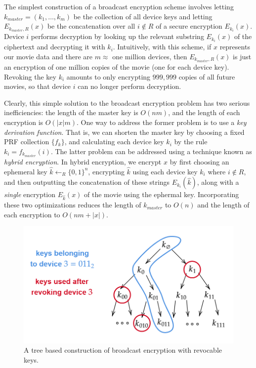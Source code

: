 The simplest construction of a broadcast encryption scheme involves
letting \(k_{master} = (k_1, \ldots, k_m)\) be the collection of all
device keys and letting \(E_{k_{master}, R}(x)\) be the concatenation
over all \(i \notin R\) of a secure encryption \(E_{k_i}(x)\). Device
\(i\) performs decryption by looking up the relevant substring
\(E_{k_i}(x)\) of the ciphertext and decrypting it with \(k_i\).
Intuitively, with this scheme, if \(x\) represents our movie data and
there are \(m \approx\) one million devices, then
\(E_{k_{master}, R}(x)\) is just an encryption of one million copies of
the movie (one for each device key). Revoking the key \(k_i\) amounts to
only encrypting \(999,999\) copies of all future movies, so that device
\(i\) can no longer perform decryption.

Clearly, this simple solution to the broadcast encryption problem has
two serious inefficiencies: the length of the master key is \(O(nm)\),
and the length of each encryption is \(O(|x|m)\). One way to address the
former problem is to use a \emph{key derivation function}. That is, we
can shorten the master key by choosing a fixed PRF collection
\(\{f_k\}\), and calculating each device key \(k_i\) by the rule
\(k_i = f_{k_{master}}(i)\). The latter problem can be addressed using a
technique known as \emph{hybrid encryption}. In hybrid encryption, we
encrypt \(x\) by first choosing an ephemeral key
\(\hat k \leftarrow_R \{0,1\}^n\), encrypting \(\hat k\) using each
device key \(k_i\) where \(i \notin R\), and then outputting the
concatenation of these strings \(E_{k_i}(\hat k)\), along with a
\emph{single} encryption \(E_{\hat k}(x)\) of the movie using the
ephermal key. Incorporating these two optimizations reduces the length
of \(k_{master}\) to \(O(n)\) and the length of each encryption to
\(O(nm + |x|)\).


\begin{figure}
\centering
\includegraphics[width=\textwidth, height=0.25\paperheight, keepaspectratio]{../figure/brdcasttreefig.png}
\caption{A tree based construction of broadcast encryption with
revocable keys.}
\label{brdcasttreefig}
\end{figure}

